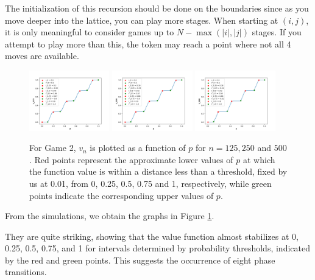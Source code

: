         The initialization of this recursion should be done on the boundaries since as you move deeper into the lattice, you can play more stages. When starting at $(i, j)$, it is only meaningful to consider games up to $N - \max(\lvert i\rvert , \lvert j\rvert )$ stages. If you attempt to play more than this, the token may reach a point where not all 4 moves are available.

        \begin{figure}[!hbt]
            \centering
            \includegraphics[width = 0.31\textwidth]{../images/game2/pN125MAXITER30.png}        
            \includegraphics[width = 0.31\textwidth]{../images/game2/pN250MAXITER30.png}        
            \includegraphics[width = 0.31\textwidth]{../images/game2/pN500MAXITER30.png}
            \caption{For Game 2, $v_{n}$ is plotted as a function of $p$ for $n = 125, 250$ and $500$. Red points represent the approximate lower values of $p$ at which the function value is within a distance less than a threshold, fixed  by us at 0.01, from 0, 0.25, 0.5, 0.75 and 1, respectively, while green points indicate the corresponding upper values of $p$.}
           \label{figurepNgame2}
        \end{figure} 

        From the simulations, we obtain the graphs in Figure \ref{figurepNgame2}.

        They are quite striking, showing that the value function almost stabilizes at 0, 0.25, 0.5, 0.75, and 1 for intervals determined by probability thresholds, indicated by the red and green points. This suggests the occurrence of eight phase transitions.

